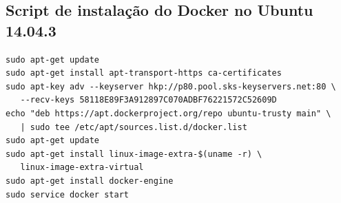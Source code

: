 \documentclass[
12pt,				%
openright,			%
oneside,			%
a4paper,			%
english,			%
french,				%
spanish,			%
brazil,				%
]{abntex2}
\begin{document}
\postextual




%
%


\begin{apendicesenv}
	
\partapendices

\chapter{Script de instalação do Docker no Ubuntu 14.04.3}

\label{apendice-script-install-docker}

\begin{lstlisting}
sudo apt-get update
sudo apt-get install apt-transport-https ca-certificates
sudo apt-key adv --keyserver hkp://p80.pool.sks-keyservers.net:80 \
   --recv-keys 58118E89F3A912897C070ADBF76221572C52609D
echo "deb https://apt.dockerproject.org/repo ubuntu-trusty main" \
   | sudo tee /etc/apt/sources.list.d/docker.list
sudo apt-get update
sudo apt-get install linux-image-extra-$(uname -r) \
   linux-image-extra-virtual
sudo apt-get install docker-engine
sudo service docker start
\end{lstlisting}
	
\end{apendicesenv}








\phantompart

\printindex
	
\end{document}
